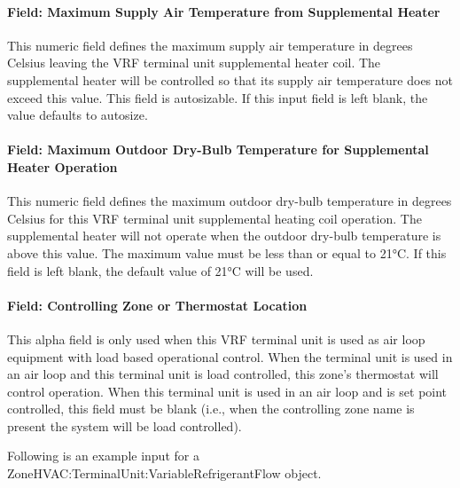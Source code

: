 \paragraph{Field: Maximum Supply Air Temperature from Supplemental Heater}\label{field-maximum-supply-air-temperature-from-supplemental-heater-2-000}

This numeric field defines the maximum supply air temperature in degrees Celsius leaving the VRF terminal unit supplemental heater coil. The supplemental heater will be controlled so that its supply air temperature does not exceed this value. This field is autosizable. If this input field is left blank, the value defaults to autosize.

\paragraph{Field: Maximum Outdoor Dry-Bulb Temperature for Supplemental Heater Operation}\label{field-maximum-outdoor-dry-bulb-temperature-for-supplemental-heater-operation-2-000}

This numeric field defines the maximum outdoor dry-bulb temperature in degrees Celsius for this VRF terminal unit supplemental heating coil operation. The supplemental heater will not operate when the outdoor dry-bulb temperature is above this value. The maximum value must be less than or equal to 21°C. If this field is left blank, the default value of 21°C will be used.

\paragraph{Field: Controlling Zone or Thermostat Location}\label{controlling-zone-or-thermostat-location-2-110}

This alpha field is only used when this VRF terminal unit is used as air loop equipment with load based operational control. When the terminal unit is used in an air loop and this terminal unit is load controlled, this zone's thermostat will control operation. When this terminal unit is used in an air loop and is set point controlled, this field must be blank (i.e., when the controlling zone name is present the system will be load controlled).

Following is an example input for a ZoneHVAC:TerminalUnit:VariableRefrigerantFlow object.

